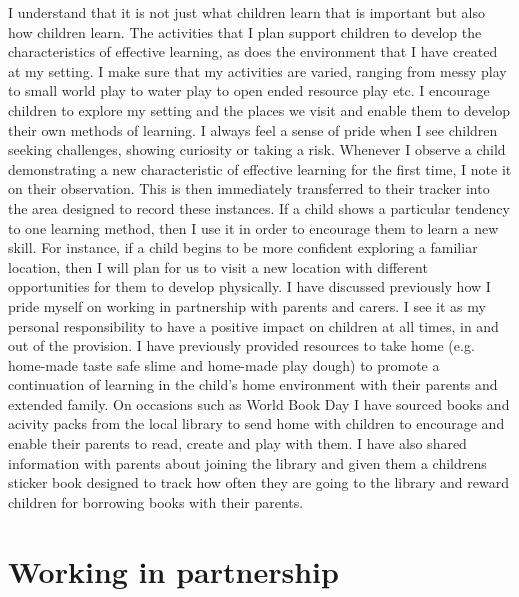 \documentclass[10pt,a4paper]{report}
\begin{document}
I understand that it is not just what children learn that is important but also how children learn. The activities that I plan support children to develop the characteristics of effective learning, as does the environment that I have created at my setting. I make sure that my activities are varied, ranging from messy play to small world play to water play to open ended resource play etc. I encourage children to explore my setting and the places we visit and enable them to develop their own methods of learning. I always feel a sense of pride when I see children seeking challenges, showing curiosity or taking a risk. Whenever I observe a child demonstrating a new characteristic of effective learning for the first time, I note it on their observation. This is then immediately transferred to their tracker into the area designed to record these instances. If a child shows a particular tendency to one learning method, then I use it in order to encourage them to learn a new skill. For instance, if a child begins to be more confident exploring a familiar location, then I will plan for us to visit a new location with different opportunities for them to develop physically.
I have discussed previously how I pride myself on working in partnership with parents and carers. 
I see it as my personal responsibility to have a positive impact on children at all times, in and out of the provision. I have previously provided resources to take home (e.g. home-made taste safe slime and home-made play dough) to promote a continuation of learning in the child's home environment with their parents and extended family. On occasions such as World Book Day I have sourced books and acivity packs from the local library to send home with children to encourage and enable their parents to read, create and play with them. I have also shared information with parents about joining the library and given them a childrens sticker book designed to track how often they are going to the library and reward children for borrowing books with their parents.

\section{Working in partnership}
\end{document}
